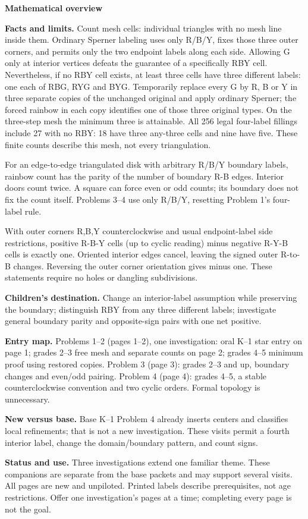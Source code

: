 \documentclass[11pt]{article}
\begin{document}
{\Large\bfseries Mathematical overview}\par\medskip
\textbf{Facts and limits.} Count mesh cells: individual triangles with no mesh line inside them. Ordinary Sperner labeling uses only R/B/Y, fixes those three outer corners, and permits only the two endpoint labels along each side. Allowing G only at interior vertices defeats the guarantee of a specifically RBY cell. Nevertheless, if no RBY cell exists, at least three cells have three different labels: one each of RBG, RYG and BYG. Temporarily replace every G by R, B or Y in three separate copies of the unchanged original and apply ordinary Sperner; the forced rainbow in each copy identifies one of those three original types. On the three-step mesh the minimum three is attainable. All 256 legal four-label fillings include 27 with no RBY: 18 have three any-three cells and nine have five. These finite counts describe this mesh, not every triangulation.

For an edge-to-edge triangulated disk with arbitrary R/B/Y boundary labels, rainbow count has the parity of the number of boundary R-B edges. Interior doors count twice. A square can force even or odd counts; its boundary does not fix the count itself. Problems 3--4 use only R/B/Y, resetting Problem 1's four-label rule.

With outer corners R,B,Y counterclockwise and usual endpoint-label side restrictions, positive R-B-Y cells (up to cyclic reading) minus negative R-Y-B cells is exactly one. Oriented interior edges cancel, leaving the signed outer R-to-B changes. Reversing the outer corner orientation gives minus one. These statements require no holes or dangling subdivisions.

\textbf{Children's destination.} Change an interior-label assumption while preserving the boundary; distinguish RBY from any three different labels; investigate general boundary parity and opposite-sign pairs with one net positive.

\textbf{Entry map.} Problems 1--2 (pages 1--2), one investigation: oral K--1 star entry on page 1; grades 2--3 free mesh and separate counts on page 2; grades 4--5 minimum proof using restored copies. Problem 3 (page 3): grades 2--3 and up, boundary changes and even/odd pairing. Problem 4 (page 4): grades 4--5, a stable counterclockwise convention and two cyclic orders. Formal topology is unnecessary.

\textbf{New versus base.} Base K--1 Problem 4 already inserts centers and classifies local refinements; that is not a new investigation. These visits permit a fourth interior label, change the domain/boundary pattern, and count signs.
\par\medskip
\textbf{Status and use.} Three investigations extend one familiar theme. These companions are separate from the base packets and may support several visits. All pages are new and unpiloted. Printed labels describe prerequisites, not age restrictions. Offer one investigation’s pages at a time; completing every page is not the goal.
\end{document}
